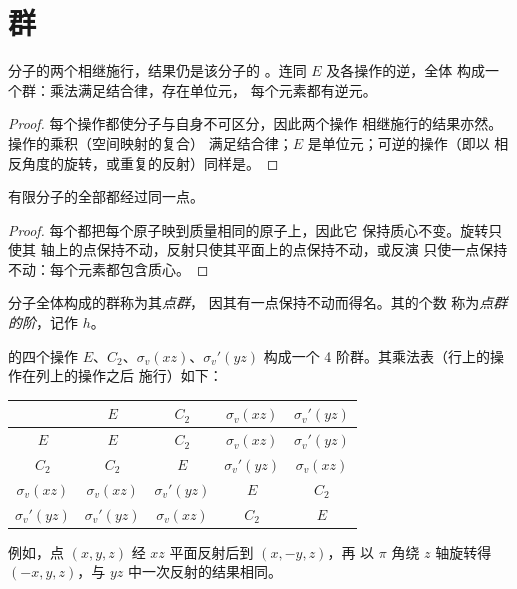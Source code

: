\section{群}

\begin{proposition}[对称操作的乘积]\label{prop:b3:point-groups:closure}
分子的两个相继施行，结果仍是该分子的
。连同 $E$ 及各操作的逆，全体
构成一个群：乘法满足结合律，存在单位元，
每个元素都有逆元。
\end{proposition}

\begin{proof}
每个操作都使分子与自身不可区分，因此两个操作
相继施行的结果亦然。操作的乘积（空间映射的复合）
满足结合律；$E$ 是单位元；可逆的操作（即以
相反角度的旋转，或重复的反射）同样是。
\end{proof}

\begin{proposition}[公共点]\label{prop:b3:point-groups:fixed-point}
有限分子的全部都经过同一点。
\end{proposition}

\begin{proof}
每个都把每个原子映到质量相同的原子上，因此它
保持质心不变。旋转只使其
轴上的点保持不动，反射只使其平面上的点保持不动，或反演
只使一点保持不动：每个元素都包含质心。
\end{proof}

\begin{definition}[点群，点群的阶]\label{def:b3:point-groups:point-group}
分子全体构成的群称为其\emph{点群}，
因其有一点保持不动而得名。其的个数
称为\emph{点群的阶}，记作
$h$。
\end{definition}

\begin{example}[水分子的群]\label{ex:b3:point-groups:c2v}
 的四个操作 $E$、$C_2$、$\sigma_v(xz)$、$\sigma_v'(yz)$ 构成一个
4 阶群。其乘法表（行上的操作在列上的操作之后
施行）如下：
\begin{center}\small
\begin{tabular}{c|cccc}
\hline
 & $E$ & $C_2$ & $\sigma_v(xz)$ & $\sigma_v'(yz)$\\ \hline
$E$ & $E$ & $C_2$ & $\sigma_v(xz)$ & $\sigma_v'(yz)$\\
$C_2$ & $C_2$ & $E$ & $\sigma_v'(yz)$ & $\sigma_v(xz)$\\
$\sigma_v(xz)$ & $\sigma_v(xz)$ & $\sigma_v'(yz)$ & $E$ & $C_2$\\
$\sigma_v'(yz)$ & $\sigma_v'(yz)$ & $\sigma_v(xz)$ & $C_2$ & $E$\\ \hline
\end{tabular}
\end{center}
例如，点 $(x, y, z)$ 经 $xz$ 平面反射后到 $(x, -y, z)$，再
以 $\pi$ 角绕 $z$ 轴旋转得 $(-x, y, z)$，与
$yz$ 中一次反射的结果相同。
\end{example}


